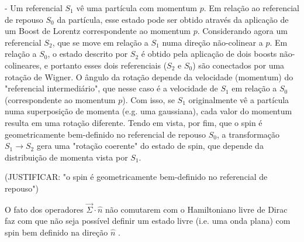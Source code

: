\documentclass[11pt,a4paper,notitlepage]{article}
\begin{document}
- Um referencial $S_1$ vê uma partícula com momentum $p$. Em relação ao referencial de repouso $S_0$ da partícula, esse estado pode ser obtido através da aplicação de um Boost de Lorentz correspondente ao momentum $p$.
Considerando agora um referencial $S_2$, que se move em relação a $S_1$ numa direção não-colinear a $p$. Em relação a $S_0$, o estado descrito por $S_2$ é obtido pela aplicação de dois boosts não-colineares, e portanto esses dois referenciais ($S_2$ e $S_0$) são conectados por uma rotação de Wigner. O ângulo da rotação depende da velocidade (momentum) do "referencial intermediário", que nesse caso é a velocidade de $S_1$ em relação a $S_0$ (correspondente ao momentum $p$). Com isso, se $S_1$ originalmente vê a partícula numa superposição de momenta (e.g. uma gaussiana), cada valor do momentum resulta em uma rotação diferente. Tendo em vista, por fim, que o spin é geometricamente bem-definido no referencial de repouso $S_0$, a transformação $S_1 \rightarrow S_2$ gera uma "rotação coerente" do estado de spin, que depende da distribuição de momenta vista por $S_1$.

(JUSTIFICAR: "o spin é  geometricamente bem-definido no referencial de repouso")


O fato dos operadores $\vec{\Sigma} \cdot \hat{n}$ não comutarem com o Hamiltoniano livre de Dirac faz com que não seja possível definir um estado livre (i.e. uma onda plana) com spin bem definido na direção $\hat{n}$ \cite{sakurai}.


 

\end{document}
